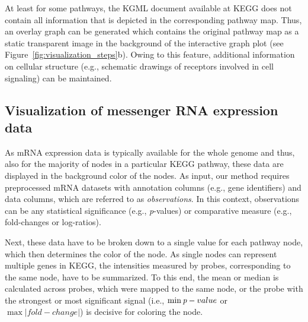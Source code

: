 \documentclass{bioinfo}
\begin{document}
%

At least for some pathways, the KGML document available at KEGG does not contain all information
that is depicted in the corresponding pathway map. Thus, an overlay graph can be generated which contains the
original pathway map as a static transparent image in the background of the interactive graph plot
(see Figure~\ref{fig:visualization_steps}b). Owing to this feature, additional information on
cellular structure (e.g., schematic drawings of receptors involved in cell signaling) can be maintained.




\subsection{Visualization of messenger RNA expression data}

As mRNA expression data is typically available for the whole genome and thus, also for the majority
of nodes in a particular KEGG pathway, these data are displayed in the background color of the
nodes.
%
As input, our method requires preprocessed mRNA datasets with annotation columns (e.g.,
gene identifiers) and data columns, which are referred to as \emph{observations}. In this context,
observations can be any statistical significance (e.g., \emph{p}-values) or comparative measure
(e.g., fold-changes or log-ratios).

Next, these data have to be broken down to a single value for each pathway node, which then
determines the color of the node. As single nodes can represent multiple genes in KEGG, the
intensities measured by probes, corresponding to the same node, have to be summarized. To this end,
the mean or median is calculated across probes, which were mapped to the same node, or the probe
with the strongest or most significant signal (i.e., $\min\emph{p}-value$ or $\max|fold-change|$) is
decisive for coloring the node.
\end{document}
